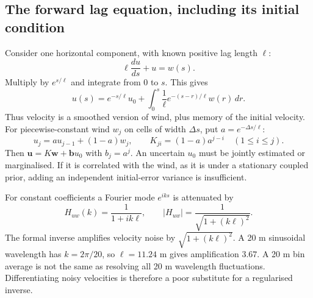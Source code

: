 \subsection{The forward lag equation, including its initial condition}
Consider one horizontal component, with known positive lag length $\ell$:
\begin{equation}
 \ell\frac{du}{ds}+u=w(s).
\end{equation}
Multiply by $e^{s/\ell}$ and integrate from $0$ to $s$. This gives
\begin{equation}
 \boxed{u(s)=e^{-s/\ell}u_0+
 \int_0^s\frac1\ell e^{-(s-r)/\ell}w(r)\,dr.}
\end{equation}
Thus velocity is a smoothed version of wind, plus memory of the initial velocity. For piecewise-constant wind $w_j$ on cells of width $\Delta s$, put $a=e^{-\Delta s/\ell}$:
\begin{equation}
 u_j=au_{j-1}+(1-a)w_j,\qquad
 K_{ji}=(1-a)a^{j-i}\quad(1\leq i\leq j).
\end{equation}
Then $\mathbf u=K\mathbf w+\mathbf b u_0$ with $b_j=a^j$. An uncertain $u_0$ must be jointly estimated or marginalised. If it is correlated with the wind, as it is under a stationary coupled prior, adding an independent initial-error variance is insufficient.

For constant coefficients a Fourier mode $e^{iks}$ is attenuated by
\begin{equation}
 H_{uw}(k)=\frac1{1+ik\ell},\qquad |H_{uw}|=\frac1{\sqrt{1+(k\ell)^2}}.
\end{equation}
The formal inverse amplifies velocity noise by $\sqrt{1+(k\ell)^2}$. A 20 m sinusoidal wavelength has $k=2\pi/20$, so $\ell=11.24$ m gives amplification $3.67$. A 20 m bin average is not the same as resolving all 20 m wavelength fluctuations. Differentiating noisy velocities is therefore a poor substitute for a regularised inverse.

